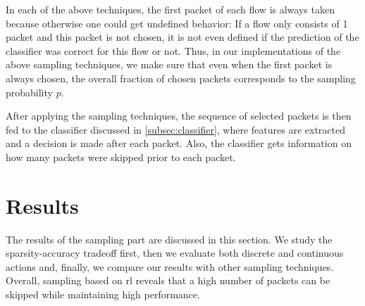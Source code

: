 \documentclass[conference]{IEEEtran}
\begin{document}
In each of the above techniques, the first packet of each flow is always taken because otherwise one could get undefined behavior: If a flow only consists of 1 packet and this packet is not chosen, it is not even defined if the prediction of the classifier was correct for this flow or not. Thus, in our implementations of the above sampling techniques, we make sure that even when the first packet is always chosen, the overall fraction of chosen packets corresponds to the sampling probability $p$.

After applying the sampling techniques, the sequence of selected packets is then fed to the classifier discussed in \autoref{subsec:classifier}, where features are extracted and a decision is made after each packet. Also, the classifier gets information on how many packets were skipped prior to each packet. 




\section{Results}

The results of the sampling part are discussed in this section. We study the sparsity-accuracy tradeoff first, then we evaluate both discrete and continuous actions and, finally, we compare our results with other sampling techniques. Overall, sampling based on \gls{rl} reveals that a high number of packets can be skipped while maintaining high performance.
\end{document}
